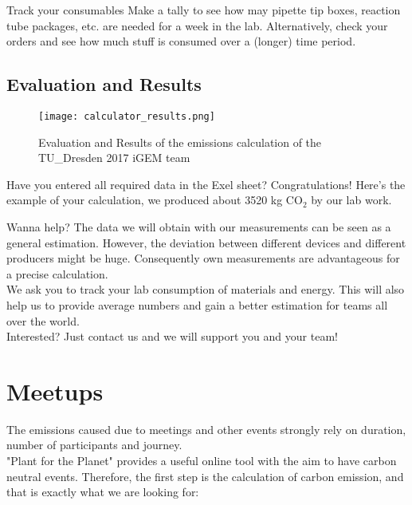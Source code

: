 \begin{suggest}{Track your consumables}
	Make a tally to see how may pipette tip boxes, reaction tube packages, etc. are needed for a week in the lab. Alternatively, check your orders and see how much stuff is consumed over a (longer) time period.
\end{suggest}

\subsection{Evaluation and Results}
\begin{wrapfigure}{r}{8cm}
	\centering
	\texttt{[image: calculator\_results.png]}%
	\caption{Evaluation and Results of the emissions calculation of the TU_Dresden 2017 iGEM team}%
\end{wrapfigure}

Have you entered all required data in the Exel sheet? Congratulations! Here’s the example of your calculation, we produced about 3520 kg CO$_2$ by our lab work.



\begin{suggest}{Wanna help?}
	The data we will obtain with our measurements can be seen as a general estimation.
	However, the deviation between different devices and different producers might be huge. Consequently own measurements are advantageous for a precise calculation.\\
	We ask you to track your lab consumption of materials and energy. This will also help us to provide average numbers and gain a better estimation for teams all over the world. \\
	Interested? Just contact us and we will support you and your team!
	
\end{suggest}

\section{Meetups}

The emissions caused due to meetings and other events strongly rely on duration, number of participants and journey. \\
"Plant for the Planet" provides a useful online tool with the aim to have carbon neutral events. Therefore, the first step is the calculation of carbon emission, and that is exactly what we are looking for:


